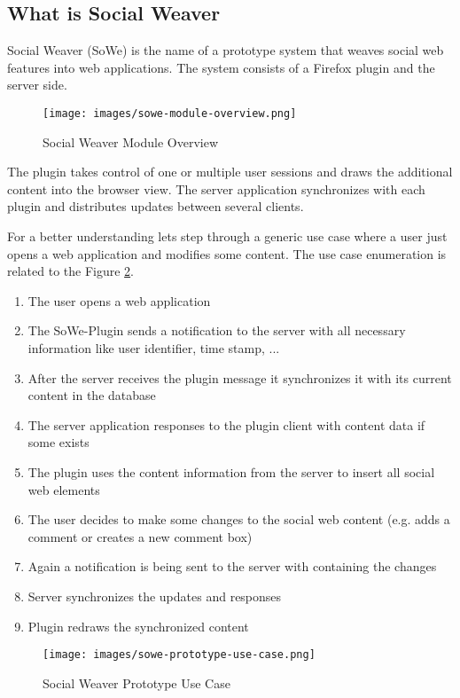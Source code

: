 \newpage
\subsection{What is Social Weaver}\label{what_is_sowe}
Social Weaver (SoWe) is the name of a prototype system that weaves social web features into web applications. The system consists of a Firefox plugin and the server side.

\begin{figure}\centering
		\texttt{[image: images/sowe-module-overview.png]}
		\caption{Social Weaver Module Overview}
		\label{msowe-module-overview}
\end{figure} 

The plugin takes control of one or multiple user sessions and draws the additional content into the browser view. The server application synchronizes with each plugin and distributes updates between several clients. 

For a better understanding lets step through a generic use case where a user just opens a web application and modifies some content. The use case enumeration is related to the Figure \ref{sowe-prototype-use-case}.

\begin{enumerate}
\item The user opens a web application
\item The SoWe-Plugin sends a notification to the server with all necessary information like user identifier, time stamp, ...
\item After the server receives the plugin message it synchronizes it with its current content in the database
\item The server application responses to the plugin client with content data if some exists
\item The plugin uses the content information from the server to insert all social web elements
\item The user decides to make some changes to the social web content (e.g. adds a comment or creates a new comment box)
\item Again a notification is being sent to the server with containing the changes
\item Server synchronizes the updates and responses
\item Plugin redraws the synchronized content
\end{enumerate}

\begin{figure}\centering
		\texttt{[image: images/sowe-prototype-use-case.png]}
		\caption{Social Weaver Prototype Use Case}
		\label{sowe-prototype-use-case}
\end{figure} 

